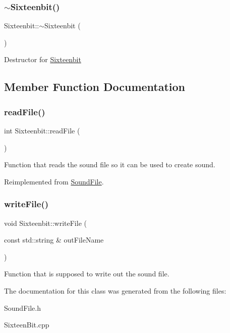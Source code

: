 \subsubsection{\texorpdfstring{$\sim$\+Sixteenbit()}{~Sixteenbit()}}
{\footnotesize\ttfamily Sixteenbit\+::$\sim$\+Sixteenbit (\begin{DoxyParamCaption}{ }\end{DoxyParamCaption})}

Destructor for \hyperlink{classSixteenbit}{Sixteenbit} 

\subsection{Member Function Documentation}
\mbox{\label{classSixteenbit_ab34f06b23dabdf172f1c0990c5648ff1}} 
\subsubsection{\texorpdfstring{read\+File()}{readFile()}}
{\footnotesize\ttfamily int Sixteenbit\+::read\+File (\begin{DoxyParamCaption}{ }\end{DoxyParamCaption})\hspace{0.3cm}{\ttfamily [virtual]}}

Function that reads the sound file so it can be used to create sound. 

Reimplemented from \hyperlink{classSoundFile_a35eb7dfeadb241c8ab4477ff1370dd5b}{Sound\+File}.

\mbox{\label{classSixteenbit_adcc83bd652c4b4732b89e59557e1e5a8}} 
\subsubsection{\texorpdfstring{write\+File()}{writeFile()}}
{\footnotesize\ttfamily void Sixteenbit\+::write\+File (\begin{DoxyParamCaption}\item[{const std\+::string \&}]{out\+File\+Name }\end{DoxyParamCaption})}

Function that is supposed to write out the sound file. 

The documentation for this class was generated from the following files\+:\begin{DoxyCompactItemize}
\item 
Sound\+File.\+h\item 
Sixteen\+Bit.\+cpp\end{DoxyCompactItemize}
